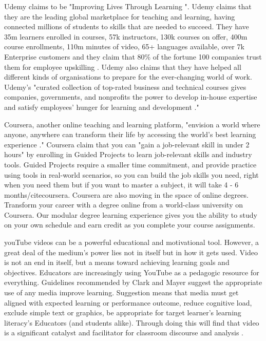 		Udemy claims to be "Improving Lives Through Learning \cite{udemy}". Udemy claims that they are the leading global marketplace for teaching and learning, having connected millions of students to skills that are needed to succeed. They have 35m learners enrolled in courses, 57k instructors, 130k courses on offer, 400m course enrollments, 110m minutes of video, 65+ languages available, over 7k Enterprise customers and they claim that 80\% of the fortune 100 companies trust them for employee upskilling \cite{udemy}. Udemy also claims that they have helped all different kinds of organisations to prepare for the ever-changing world of work. Udemy's "curated collection of top-rated business and technical courses gives companies, governments, and nonprofits the power to develop in-house expertise and satisfy employees' hunger for learning and development \cite{udemy}." 
		
		Coursera, another online teaching and learning platform, "envision a world where anyone, anywhere can transform their life by accessing the world's best learning experience \cite{coursera}." Coursera claim that you can "gain a job-relevant skill in under 2 hours" by enrolling in Guided Projects to learn job-relevant skills and industry tools. Guided Projects require a smaller time commitment, and provide practice using tools in real-world scenarios, so you can build the job skills you need, right when you need them but if you want to master a subject, it will take 4 - 6 months/cite{coursera}. Coursera are also moving in the space of online degrees. Transform your career with a degree online from a world-class university on Coursera. Our modular degree learning experience gives you the ability to study on your own schedule and earn credit as you complete your course assignments. 
		
		youTube videos can be a powerful educational and motivational tool. However, a great deal of the medium's power lies not in itself but in how it gets used. Video is not an end in itself, but a means toward achieving learning goals and objectives. Educators are increasingly using YouTube as a pedagogic resource for everything. Guidelines recommended by Clark and Mayer \cite{clark2016learning} suggest the appropriate use of any media improve learning. Suggestion means that media must get aligned with expected learning or performance outcome, reduce cognitive load, exclude simple text or graphics, be appropriate for target learner's learning literacy's Educators (and students alike). Through doing this will find that video is a significant catalyst and facilitator for classroom discourse and analysis \cite{duffy2008engaging}.
		

